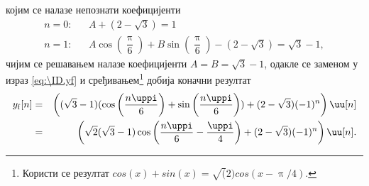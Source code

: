 којим се налазе непознати коефицијенти
\begin{eqnarray}
    n = 0: && A 
    + (2 - \sqrt 3) = 1 \\
    n = 1: && A \cos\left(\dfrac{\uppi}6\right) + B \sin\left(\dfrac{\uppi}6\right)
    - (2 - \sqrt 3) = \sqrt3 -1,
\end{eqnarray}
чијим се решавањем налазе коефицијенти $A = B = \sqrt3 - 1$, одакле се заменом у израз \ref{eq:\ID.yf} и
сређивањем\footnote{Користи се резултат  
$cos(x) + sin(x) = \sqrt(2) cos(x - \uppi/4)$.
} добија коначни резултат
\begin{eqnarray}
    y_{\rm f}[n] &=&  \left( (\sqrt3 - 1) (\cos\left(\dfrac{n\uppi}6\right) + \sin\left(\dfrac{n\uppi}6\right))
    + (2 - \sqrt 3) (-1)^n \right) \uu[n]
    \\ &=&
    \left( \sqrt 2(\sqrt3 - 1) \cos\left(\dfrac{n\uppi}6 - \dfrac{\uppi}{4}\right)
    + (2 - \sqrt 3) (-1)^n \right) \uu[n].
\end{eqnarray}
